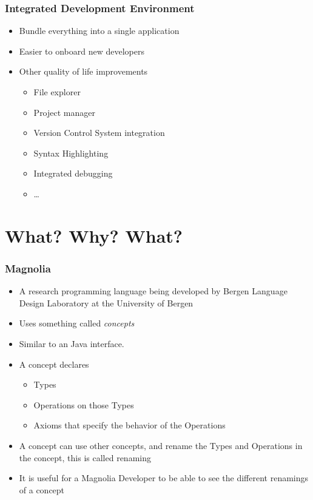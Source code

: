 \documentclass{beamer}
\begin{document}
\begin{frame}
  \frametitle{Integrated Development Environment}
  \begin{itemize}
    \item Bundle everything into a single application
    \item Easier to onboard new developers
    \item Other quality of life improvements
    \begin{itemize}
      \item File explorer
      \item Project manager
      \item Version Control System integration
      \item Syntax Highlighting
      \item Integrated debugging
      \item \dots
    \end{itemize}
  \end{itemize}
\end{frame}

\section{What? Why? What?}
\SectionPage

\begin{frame}
  \frametitle{Magnolia}
  \begin{itemize}
    \item A research programming language being developed by
      Bergen Language Design Laboratory at the University of Bergen
    \item Uses something called \textit{concepts}
    \item Similar to an Java interface.
    \item A concept declares
    \begin{itemize}
      \item Types
      \item Operations on those Types
      \item Axioms that specify the behavior of the Operations
    \end{itemize}
    \item A concept can use other concepts, and rename the Types and Operations
      in the concept, this is called renaming
    \item It is useful for a Magnolia Developer to be able to see the different
      renamings of a concept
  \end{itemize}
\end{frame}
\end{document}
